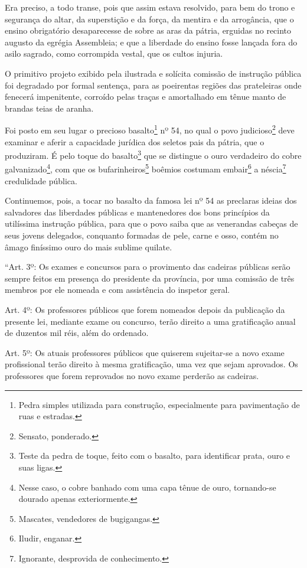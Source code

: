 Era preciso, a todo transe, pois que assim estava resolvido, para bem do
trono e segurança do altar, da superstição e da força, da mentira e da
arrogância, que o ensino obrigatório desaparecesse de sobre as aras da
pátria, erguidas no recinto augusto da egrégia Assembleia; e que a
liberdade do ensino fosse lançada fora do asilo sagrado, como corrompida
vestal, que os cultos injuria.

O primitivo projeto exibido pela ilustrada e solícita comissão de
instrução pública foi degradado por formal sentença, para as poeirentas
regiões das prateleiras onde fenecerá impenitente, corroído pelas traças
e amortalhado em tênue manto de brandas teias de aranha.

Foi posto em seu lugar o precioso basalto\footnote{Pedra simples
  utilizada para construção, especialmente para pavimentação de ruas e
  estradas.} nº 54, no qual o povo judicioso\footnote{Sensato,
  ponderado.} deve examinar e aferir a capacidade jurídica dos seletos
pais da pátria, que o produziram. É pelo toque do basalto\footnote{
  Teste da pedra de toque, feito com o basalto, para identificar prata,
  ouro e suas ligas.} que se distingue o ouro verdadeiro do cobre
galvanizado\footnote{Nesse caso, o cobre banhado com uma capa tênue de
  ouro, tornando-se dourado apenas exteriormente.}, com que os
bufarinheiros\footnote{Mascates, vendedores de bugigangas.} boêmios
costumam embair\footnote{Iludir, enganar.} a néscia\footnote{
  Ignorante, desprovida de conhecimento.} credulidade pública.

Continuemos, pois, a tocar no basalto da famosa lei nº 54 as preclaras
ideias dos salvadores das liberdades públicas e mantenedores dos bons
princípios da utilíssima instrução pública, para que o povo saiba que as
venerandas cabeças de seus jovens delegados, conquanto formadas de pele,
carne e osso, contém no âmago finíssimo ouro do mais sublime quilate.

``Art. 3º: Os exames e concursos para o provimento das cadeiras públicas
serão sempre feitos em presença do presidente da província, por uma
comissão de três membros por ele nomeada e com assistência do inspetor
geral.

Art. 4º: Os professores públicos que forem nomeados depois da publicação
da presente lei, mediante exame ou concurso, terão direito a uma
gratificação anual de duzentos mil réis, além do ordenado.

Art. 5º: Os atuais professores públicos que quiserem sujeitar-se a novo
exame profissional terão direito à mesma gratificação, uma vez que sejam
aprovados. Os professores que forem reprovados no novo exame perderão as
cadeiras.

